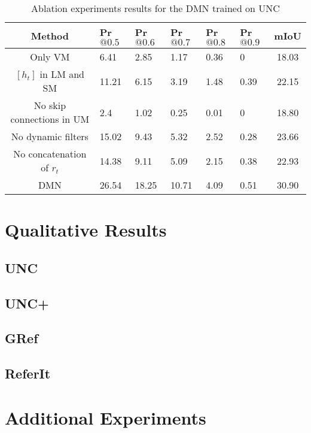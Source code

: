 \begin{table}[!htbp]
    \centering
    \begin{tabular}{ c | p{1.2cm} p{1.2cm} p{1.2cm} p{1.2cm} p{1.2cm} | c }
\hline
Method 								& Pr$@0.5$		& Pr$@0.6$		& Pr$@0.7$		& Pr$@0.8$		& Pr$@0.9$		& mIoU			\\
\hline
Only VM 							& 6.41 			& 2.85 			& 1.17 			& 0.36 			& 0 			& 18.03 		\\
$[h_{t}]$ in LM and SM	& 11.21 		& 6.15 			& 3.19			& 1.48 			& 0.39			& 22.15 		\\
No skip connections in UM 			& 2.4 			& 1.02 			& 0.25 			& 0.01 			& 0 			& 18.80 		\\
No dynamic filters					& 15.02 		& 9.43 			& 5.32 			& 2.52 			& 0.28 			& 23.66 		\\
No concatenation of $r_{t}$			& 14.38 		& 9.11 			& 5.09			& 2.15 			& 0.38			& 22.93 		\\
\hline
DMN							& 26.54 		& 18.25 		& 10.71 		& 4.09 			& 0.51 			& 30.90	 		\\
\hline
\end{tabular}
    \caption{Ablation experiments results for the DMN trained on UNC}
    \label{tab:my_label}
\end{table}

\section{Qualitative Results}
\subsection*{UNC}
\subsection*{UNC+}
\subsection*{GRef}
\subsection*{ReferIt}

\section{Additional Experiments}